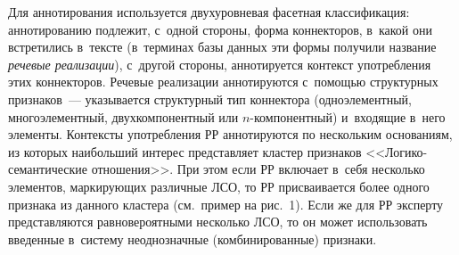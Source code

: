 \begin{multicols}{2}
  Для аннотирования используется двухуровневая фасетная классификация: 
аннотированию подлежит, с~одной стороны, форма коннекторов, в~какой они 
встретились в~тексте (в~терминах базы данных эти формы получили название 
\textit{речевые реализации}), с~другой стороны, аннотируется контекст 
употребления этих коннекторов. Речевые реализации аннотируются с~помощью структурных 
признаков~--- указывается структурный тип коннектора (одноэлементный, 
многоэлементный, двухкомпонентный или $n$-ком\-по\-нент\-ный) и~входящие 
в~него элементы. Контексты употребления РР аннотируются по нескольким 
основаниям, из которых наибольший интерес представляет кластер признаков 
<<Ло\-ги\-ко-се\-ман\-ти\-че\-ские отношения>>. При этом если РР включает 
в~себя несколько элементов, маркирующих различные ЛСО, то РР 
присваивается более одного признака из данного кластера (см.\ пример на 
рис.~1). Если же для РР эксперту представляются равновероятными несколько 
ЛСО, то он может использовать введенные в~систему неоднозначные 
(комбинированные) признаки.
  

\end{multicols}

\begin{figure*} %
  \vspace*{1pt}
    \begin{center}  
  \mbox{%
 \epsfxsize=147.81mm 
 }
 \end{center}
\vspace*{-9pt}
  \end{figure*}

